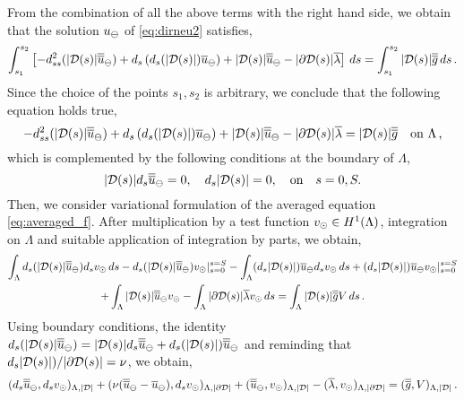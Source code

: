 From the combination of all the above terms with the right hand side, we obtain that the solution $u_{\ominus}$ of \eqref{eq:dirneu2} satisfies,
\begin{equation*}
\int_{s_1}^{s_2} \left[ 
-d_{ss}^2 (|\mathcal{D}(s)|\overline{\overline{u}}_{\ominus}) +  d_s\left(d_s(|\mathcal{D}(s)|) \overline{u}_{\ominus}\right) + |\mathcal{D}(s)|\overline{\overline{u}}_{\ominus} 
- |\partial\mathcal{D}(s)| \overline{\lambda} 
\right] \, ds = \int_{s_1}^{s_2} |\mathcal{D}(s)| \overline{\overline{g}}\, ds \,.
\end{equation*}
Since the choice of the points $s_1,s_2$ is arbitrary, we conclude that the following equation holds true,
\begin{equation}\label{eq:averaged_f}
-d_{ss}^2 (|\D(s)|\avrd{u}_{\ominus}) +  d_s\left(d_s(|\D(s)|) \avrc{u}_{\ominus}\right) + |\D(s)|\avrd{u}_{\ominus} 
- |\partial\mathcal{D}(s)| \avrc{\lambda}
= |\mathcal{D}(s)| \avrd{g} \quad \text{on} \ \Lambda\,,
\end{equation}
which is complemented by the following conditions at the boundary of $\Lambda$,
\begin{equation}\label{eq:averaged_f_boundary}
|\D(s)| d_s \avrd{u}_{\ominus} = 0, \quad d_s |\D(s)| = 0, \quad \text{on} \quad s=0,S.
\end{equation}
Then, we consider variational formulation of the averaged equation \eqref{eq:averaged_f}.
After multiplication by a test function $v_{\odot} \in H^1(\Lambda)$, integration on $\Lambda$ and suitable application of integration by parts, we obtain,
\begin{multline*}
\int_\Lambda d_s (|\mathcal{D}(s)| \overline{\overline{u}}_{\ominus} ) d_s v_{\odot} \, ds - d_s (|\mathcal{D}(s)| \overline{\overline{u}}_{\ominus} ) v_{\odot} |_{s=0}^{s=S}
- \int_\Lambda (d_s |\mathcal{D}(s)|)\overline{u}_{\ominus} d_s v_{\odot} \, ds + (d_s |\mathcal{D}(s)|) \overline{u}_{\ominus} v_{\odot} |_{s=0}^{s=S}
\\
+\int_\Lambda |\mathcal{D}(s)| \overline{\overline{u}}_\ominus v_{\odot} - \int_\Lambda |\partial\mathcal{D}(s)| \overline{\lambda} v_{\odot} \, ds
= \int_\Lambda |\mathcal{D}(s)| \overline{\overline{g}} V\, ds\,.
\end{multline*}
Using boundary conditions, 
the identity $d_s (|\mathcal{D}(s)| \overline{\overline{u}}_{\ominus} ) = |\mathcal{D}(s)| d_s \overline{\overline{u}}_{\ominus} + d_s (|\mathcal{D}(s)|) \overline{\overline{u}}_{\ominus}$
and reminding that $d_s |\mathcal{D}(s)|)/|\partial\mathcal{D}(s)| = \nu$,
we obtain,
\begin{equation}\label{eq:averaged_f_weak}
(d_s \avrd{u}_{\ominus}, d_s \vd )_{\Lambda,|\D|} 
+ ( \nu (\avrd{u}_{\ominus} - \avrc{u}_{\ominus}), d_s \vd)_{\Lambda,|\DD|} +(\avrd{u}_\ominus, \vd)_{\Lambda, |\D|}
- (\avrc{\lambda},\vd)_{\Lambda,|\DD|}
= (\avrd{g},V)_{\Lambda,|\D|}\,.
\end{equation}
